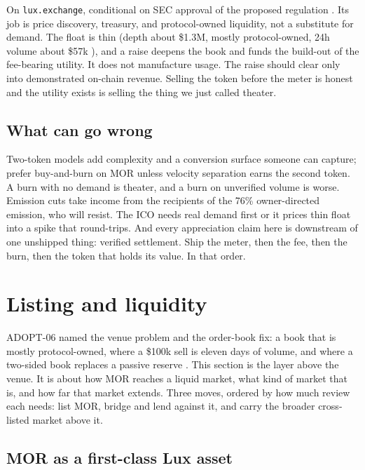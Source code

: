 \documentclass[11pt,a4paper]{article}
\newcommand{\code}[1]{\texttt{\small #1}}
\newcommand{\prov}[1]{{\color{muted}\footnotesize\sffamily[#1]}}
\begin{document}
On \code{lux.exchange}, conditional on SEC approval of the proposed regulation \prov{pending}.
Its job is price discovery, treasury, and protocol-owned liquidity, not a substitute for
demand. The float is thin (depth about \$1.3M, mostly protocol-owned, 24h volume about \$57k
\prov{verified}), and a raise deepens the book and funds the build-out of the fee-bearing
utility. It does not manufacture usage. The raise should clear only into demonstrated on-chain
revenue. Selling the token before the meter is honest and the utility exists is selling the
thing we just called theater.

\subsection{What can go wrong}

Two-token models add complexity and a conversion surface someone can capture; prefer
buy-and-burn on MOR unless velocity separation earns the second token. A burn with no demand is
theater, and a burn on unverified volume is worse. Emission cuts take income from the recipients
of the 76\% owner-directed emission, who will resist. The ICO needs real demand first or it
prices thin float into a spike that round-trips. And every appreciation claim here is downstream
of one unshipped thing: verified settlement. Ship the meter, then the fee, then the burn, then
the token that holds its value. In that order.

\section{Listing and liquidity}
\label{sec:listing}

ADOPT-06 named the venue problem and the order-book fix: a book that is mostly protocol-owned,
where a \$100k sell is eleven days of volume, and where a two-sided book replaces a passive
reserve \prov{verified}. This section is the layer above the venue. It is about how MOR reaches a
liquid market, what kind of market that is, and how far that market extends. Three moves, ordered
by how much review each needs: list MOR, bridge and lend against it, and carry the broader
cross-listed market above it.

\subsection{MOR as a first-class Lux asset}
\end{document}
